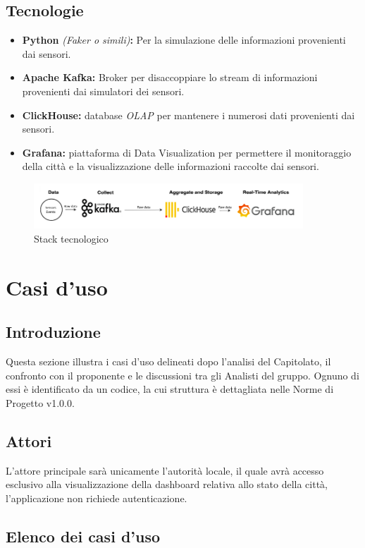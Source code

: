 \documentclass{article}
\begin{document}
\subsection{Tecnologie}
\begin{itemize}
    \item \textbf{Python} \textit{(Faker o simili)}\textbf{:} Per la simulazione delle informazioni provenienti dai sensori.
    \item \textbf{Apache Kafka:} Broker per disaccoppiare lo stream di informazioni provenienti dai simulatori dei sensori.
    \item \textbf{ClickHouse:} database \textit{OLAP} per mantenere i numerosi dati provenienti dai sensori.
    \item \textbf{Grafana:} piattaforma di Data Visualization per permettere il monitoraggio della città e la visualizzazione delle informazioni raccolte dai sensori.
\end{itemize}

\begin{figure}[H]
    \centering
    \includegraphics[width=0.9\textwidth]{Images/stackTecnologico.PNG}
    \caption{Stack tecnologico}
    \label{fig:stackTecnologico}
\end{figure}

\section{Casi d'uso}
\subsection{Introduzione}
Questa sezione illustra i casi d'uso delineati dopo l'analisi del Capitolato, il confronto con il proponente e le discussioni tra gli Analisti del gruppo. Ognuno di essi è identificato da un codice, la cui struttura è dettagliata nelle Norme di Progetto v1.0.0.
\subsection{Attori}
L'attore principale sarà unicamente l'autorità locale, il quale avrà accesso esclusivo alla visualizzazione della dashboard relativa allo stato della città, l'applicazione non richiede autenticazione.
\subsection{Elenco dei casi d'uso}
\end{document}

